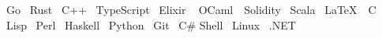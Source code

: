 
\raggedright{
  \textbullet{}~Go \textbullet{}~Rust \textbullet{}~C++ \textbullet{}~TypeScript \textbullet{}~Elixir \textbullet{}~
  OCaml\ \textbullet{}~Solidity \textbullet{}~Scala \textbullet{}~\LaTeX\ 
  \textbullet{}~C \textbullet{}~Lisp \textbullet{}~Perl \textbullet{}~Haskell 
  \textbullet{}~Python \textbullet{}~Git \textbullet{}~C\# \textbullet{} Shell 
  \textbullet{}~Linux \textbullet{}~.NET 
}